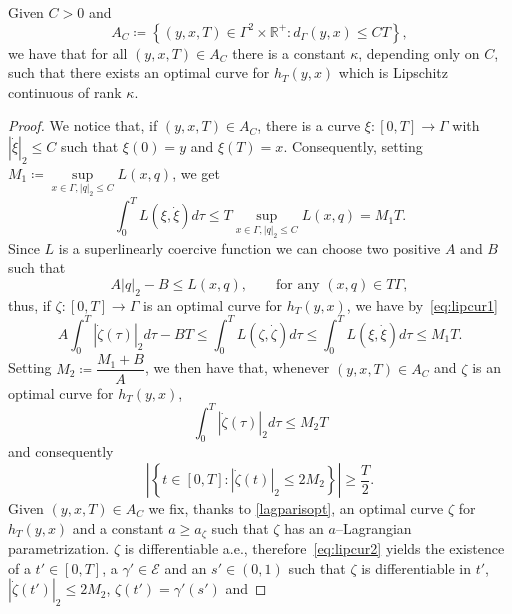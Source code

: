\documentclass[11pt,a4paper,american]{article}
\newcommand{\Ecal}{\mathcal E}
\newcommand{\Rds}{\mathds R}
\begin{document}
    \begin{lem}\label{lipcur}
        Given $C>0$ and
        \begin{equation}\label{eq:lipcur.1}
            A_C\coloneqq\left\{(y,x,T)\in\Gamma^2\times\Rds^+:d_\Gamma(y,x)\le CT\right\},
        \end{equation}
        we have that for all $(y,x,T)\in A_C$ there is a constant $\kappa$, depending only on $C$, such that there exists an optimal curve for $h_T(y,x)$ which is Lipschitz continuous of rank $\kappa$.
    \end{lem}
    \begin{proof}
        We notice that, if $(y,x,T)\in A_C$, there is a curve $\xi:[0,T]\to\Gamma$ with $|\dot\xi|_2\le C$ such that $\xi(0)=y$ and $\xi(T)=x$. Consequently, setting $M_1\coloneqq\sup\limits_{x\in\Gamma,|q|_2\le C}L(x,q)$, we get
        \begin{equation}\label{eq:lipcur1}
            \int_0^T L\left(\xi,\dot\xi\right)d\tau\le T\sup_{x\in\Gamma,|q|_2\le C}L(x,q)=M_1T.
        \end{equation}
        Since $L$ is a superlinearly coercive function we can choose two positive $A$ and $B$ such that
        \begin{equation*}
            A|q|_2-B\le L(x,q),\qquad\text{for any }(x,q)\in T\Gamma,
        \end{equation*}
        thus, if $\zeta:[0,T]\to\Gamma$ is an optimal curve for $h_T(y,x)$, we have by~\cref{eq:lipcur1}
        \begin{equation*}
            A\int_0^T\left|\dot\zeta(\tau)\right|_2d\tau-BT\le\int_0^T L\left(\zeta,\dot\zeta\right)d\tau\le\int_0^T L\left(\xi,\dot\xi\right)d\tau\le M_1T.
        \end{equation*}
        Setting $M_2\coloneqq\dfrac{M_1+B}A$, we then have that, whenever $(y,x,T)\in A_C$ and $\zeta$ is an optimal curve for $h_T(y,x)$,
        \begin{equation*}
            \int_0^T\left|\dot\zeta(\tau)\right|_2d\tau\le M_2T
        \end{equation*}
        and consequently
        \begin{equation}\label{eq:lipcur2}
            \left|\left\{t\in[0,T]:\left|\dot\zeta(t)\right|_2\le2M_2\right\}\right|\ge\frac T2.
        \end{equation}
        Given $(y,x,T)\in A_C$ we fix, thanks to \cref{lagparisopt}, an optimal curve $\zeta$ for $h_T(y,x)$ and a constant $a\ge a_\zeta$ such that $\zeta$ has an $a$--Lagrangian parametrization. $\zeta$ is differentiable a.e., therefore~\cref{eq:lipcur2} yields the existence of a $t'\in[0,T]$, a $\gamma'\in\Ecal$ and an $s'\in(0,1)$ such that $\zeta$ is differentiable in $t'$, $\left|\dot\zeta(t')\right|_2\le2M_2$, $\zeta(t')=\gamma'(s')$ and

\end{proof}
\end{document}
